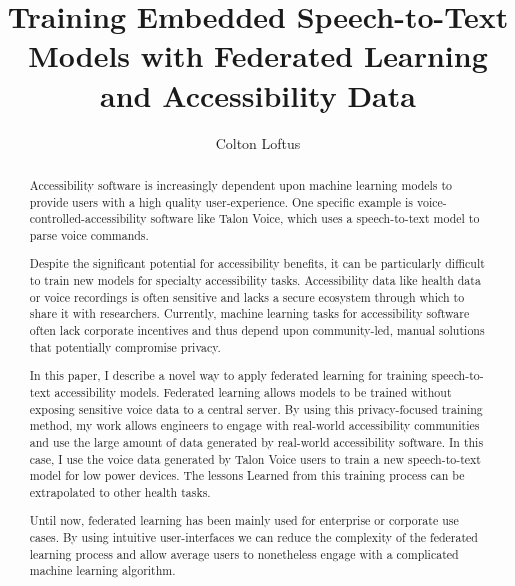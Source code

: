 \documentclass[manuscript,screen,review]{acmart}
\begin{document}
\title{Training Embedded Speech-to-Text Models with Federated Learning and Accessibility Data }

\author{Colton Loftus}


\renewcommand{\shortauthors}{Loftus}

\begin{abstract}
  Accessibility software is increasingly dependent upon machine learning models to provide users with a high quality user-experience.  One specific example is voice-controlled-accessibility software like Talon Voice, which uses a speech-to-text model to parse voice commands.

  Despite the significant potential for accessibility benefits, it can be particularly difficult to train new models for specialty accessibility tasks.  Accessibility data like health data or voice recordings is often sensitive and lacks a secure ecosystem through which to share it with researchers. Currently, machine learning tasks for accessibility software often lack corporate incentives and thus depend upon community-led, manual solutions that potentially compromise privacy.

  In this paper, I describe a novel way to apply federated learning for training speech-to-text accessibility models. Federated learning allows models to be trained without exposing sensitive voice data to a central server. By using this privacy-focused training method, my work allows engineers to engage with real-world accessibility communities and use the large amount of data generated by real-world accessibility software. In this case, I use the voice data generated by Talon Voice users to train a new speech-to-text model for low power devices.  The lessons Learned from this training process can be extrapolated to other health tasks.

  Until now, federated learning has been mainly used for enterprise or corporate use cases. By using intuitive user-interfaces we can reduce the complexity of the federated learning process and allow average users to nonetheless engage with a complicated machine learning algorithm. 

\end{abstract}
\end{document}

